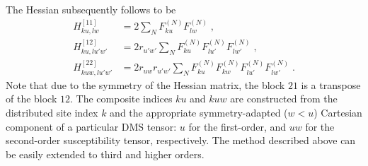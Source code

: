 \documentclass[aip,amsmath,amssymb,reprint,floatfix]{revtex4-1}
\begin{document}
The Hessian subsequently follows to be
%
\begin{subequations}
 \begin{align}
  H^{[11]}_{ku,lw} &= 2\sum_N F^{(N)}_{ku} F^{(N)}_{lw} \;,\\
  H^{[12]}_{ku,lu'w'} &= 2r_{u'w'} \sum_N F^{(N)}_{ku} F^{(N)}_{lu'} F^{(N)}_{lw'}  \;,\\
  H^{[22]}_{kuw,lu'w'} &= 2r_{uw} r_{u'w'} \sum_N F^{(N)}_{ku} F^{(N)}_{kw} F^{(N)}_{lu'} F^{(N)}_{lw'} \;.
 \end{align}
\end{subequations}
%
Note that due to the symmetry of the Hessian matrix, the block $21$
is a transpose of the block $12$. The composite indices $ku$ and $kuw$ 
are constructed from the distributed site index $k$ and the appropriate 
symmetry\hyp{}adapted ($w<u$) Cartesian component of a particular DMS tensor: 
$u$ for the first\hyp{}order, and $uw$ for the second\hyp{}order susceptibility 
tensor, respectively. The method described above can be easily extended 
to third and higher orders.


\end{document}
